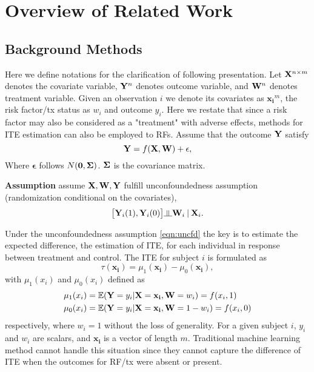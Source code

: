 \section{Overview of Related Work}
\label{sec:ite_overview}
  \subsection{Background Methods}
    Here we define notations for the clarification of following presentation. Let $\mathbf{X}^{n \times m}$ denotes the covariate variable, $\mathbf{Y}^n$ denotes outcome variable, and $\mathbf{W}^n$ denotes treatment variable. Given an observation $i$ we denote its covariates as $\mathbf{x_i}^m$, the risk factor/tx status as $w_i$ and outcome $y_i$. Here we restate that since a risk factor may also be considered as a "treatment" with adverse effects, methods for ITE estimation can also be employed to RFs. Assume that the outcome $\mathbf{Y}$ satisfy
    \begin{equation}
      \mathbf{Y} = f (\mathbf{X}, \mathbf{W}) + \mathbf{\epsilon},
    \end{equation}
    Where $\mathbf{\epsilon}$ follows $N(\mathbf{0}, \bm\Sigma)$. $\bm\Sigma$ is the covariance matrix.
 
    \textbf{Assumption} assume $\mathbf{X}, \mathbf{W}, \mathbf{Y}$ fulfill unconfoundedness assumption (randomization conditional on the covariates), 
    \begin{equation}
      \label{eqn:uncfd}
      \big[ \bY_i(1), \bY_i(0) \big] \indep \bW_i \given \bX_i. 
    \end{equation}
    
    Under the unconfoundedness assumption \ref{eqn:uncfd} the key is to estimate the expected difference, the estimation of ITE, for each individual in response between treatment and control. The ITE for subject $i$ is formulated as 
    \begin{equation}
      \tau(\mathbf{x_i}) = \mu_1 (\mathbf{x_i}) - \mu_0 (\mathbf{x_i}),
    \end{equation}
    with $\mu_1(x_i)$ and $\mu_0(x_i)$ defined as 
    \begin{equation}
      \label{eqn:ite_tau}
      \begin{split}
        \mu_1(x_i) & = \mathbb{E}(\mathbf{Y} = y_i|\mathbf{X}=\mathbf{x_i}, \mathbf{W} = w_i) = f(x_i, 1)\\
        \mu_0(x_i) & = \mathbb{E}(\mathbf{Y} = y_i|\mathbf{X}=\mathbf{x_i}, \mathbf{W} = 1 - w_i) = f(x_i, 0)
      \end{split}
    \end{equation} 
    respectively, where $w_i = 1$ without the loss of generality. For a given subject $i$, $y_i$ and $w_i$ are scalars, and $\mathbf{x_i}$ is a vector of length $m$. 
    Traditional machine learning method cannot handle this situation since they cannot capture the difference of ITE when the outcomes for RF/tx were absent or present. 

